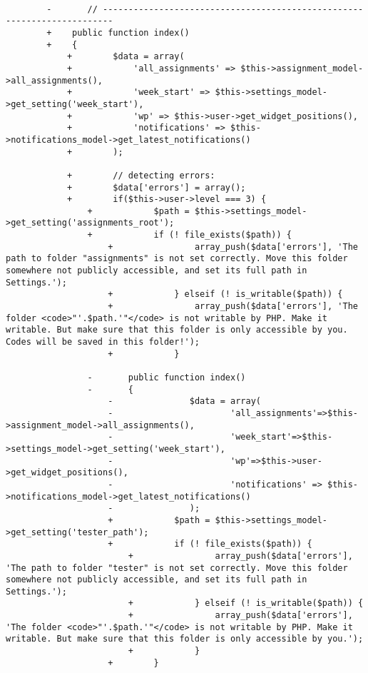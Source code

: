 \begin{lstlisting}[basicstyle=\ttfamily, frame=single,
	columns=fullflexible, keepspaces=true, breaklines=true, label=ck:31, caption=Contoh penggunaan PHP CS Fixer pada \textit{Dashboard.php}]
		
		-       // ------------------------------------------------------------------------
		+    public function index()
		+    {
			+        $data = array(
			+            'all_assignments' => $this->assignment_model->all_assignments(),
			+            'week_start' => $this->settings_model->get_setting('week_start'),
			+            'wp' => $this->user->get_widget_positions(),
			+            'notifications' => $this->notifications_model->get_latest_notifications()
			+        );
			
			+        // detecting errors:
			+        $data['errors'] = array();
			+        if($this->user->level === 3) {
				+            $path = $this->settings_model->get_setting('assignments_root');
				+            if (! file_exists($path)) {
					+                array_push($data['errors'], 'The path to folder "assignments" is not set correctly. Move this folder somewhere not publicly accessible, and set its full path in Settings.');
					+            } elseif (! is_writable($path)) {
					+                array_push($data['errors'], 'The folder <code>"'.$path.'"</code> is not writable by PHP. Make it writable. But make sure that this folder is only accessible by you. Codes will be saved in this folder!');
					+            }
				
				-       public function index()
				-       {
					-               $data = array(
					-                       'all_assignments'=>$this->assignment_model->all_assignments(),
					-                       'week_start'=>$this->settings_model->get_setting('week_start'),
					-                       'wp'=>$this->user->get_widget_positions(),
					-                       'notifications' => $this->notifications_model->get_latest_notifications()
					-               );
					+            $path = $this->settings_model->get_setting('tester_path');
					+            if (! file_exists($path)) {
						+                array_push($data['errors'], 'The path to folder "tester" is not set correctly. Move this folder somewhere not publicly accessible, and set its full path in Settings.');
						+            } elseif (! is_writable($path)) {
						+                array_push($data['errors'], 'The folder <code>"'.$path.'"</code> is not writable by PHP. Make it writable. But make sure that this folder is only accessible by you.');
						+            }
					+        }
				

\end{lstlisting}
